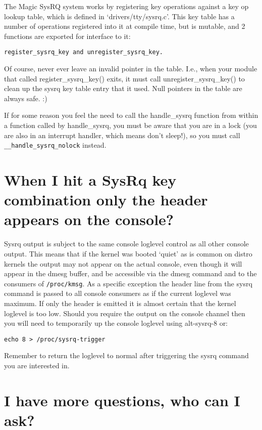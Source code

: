 \documentclass[article,letterpaper]{memoir}
\let\subsection\section
\let\section\chapter
\begin{document}
The Magic SysRQ system works by registering key operations against a key
op lookup table, which is defined in `drivers/tty/sysrq.c'. This key
table has a number of operations registered into it at compile time, but
is mutable, and 2 functions are exported for interface to it:

\begin{verbatim}
register_sysrq_key and unregister_sysrq_key.
\end{verbatim}

Of course, never ever leave an invalid pointer in the table. I.e., when
your module that called register\_sysrq\_key() exits, it must call
unregister\_sysrq\_key() to clean up the sysrq key table entry that it
used. Null pointers in the table are always safe. :)

If for some reason you feel the need to call the handle\_sysrq function
from within a function called by handle\_sysrq, you must be aware that
you are in a lock (you are also in an interrupt handler, which means
don't sleep!), so you must call \texttt{\_\_handle\_sysrq\_nolock}
instead.

\subsection{When I hit a SysRq key combination only the header appears
on the
console?}\label{when-i-hit-a-sysrq-key-combination-only-the-header-appears-on-the-console}

Sysrq output is subject to the same console loglevel control as all
other console output. This means that if the kernel was booted `quiet'
as is common on distro kernels the output may not appear on the actual
console, even though it will appear in the dmesg buffer, and be
accessible via the dmesg command and to the consumers of
\texttt{/proc/kmsg}. As a specific exception the header line from the
sysrq command is passed to all console consumers as if the current
loglevel was maximum. If only the header is emitted it is almost certain
that the kernel loglevel is too low. Should you require the output on
the console channel then you will need to temporarily up the console
loglevel using alt-sysrq-8 or:

\begin{verbatim}
echo 8 > /proc/sysrq-trigger
\end{verbatim}

Remember to return the loglevel to normal after triggering the sysrq
command you are interested in.

\subsection{I have more questions, who can I
ask?}\label{i-have-more-questions-who-can-i-ask}
\end{document}
